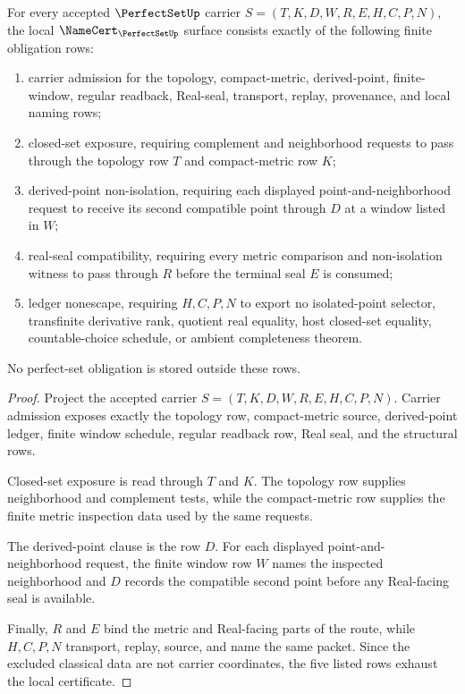 \begin{theorem}
\label{thm:perfect-set-namecert-obligations}
For every accepted $\PerfectSetUp$ carrier $S=(T,K,D,W,R,E,H,C,P,N)$, the local $\NameCert_{\PerfectSetUp}$ surface consists exactly of the following finite obligation rows:
\begin{enumerate}
\item carrier admission for the topology, compact-metric, derived-point, finite-window, regular readback, Real-seal, transport, replay, provenance, and local naming rows;
\item closed-set exposure, requiring complement and neighborhood requests to pass through the topology row $T$ and compact-metric row $K$;
\item derived-point non-isolation, requiring each displayed point-and-neighborhood request to receive its second compatible point through $D$ at a window listed in $W$;
\item real-seal compatibility, requiring every metric comparison and non-isolation witness to pass through $R$ before the terminal seal $E$ is consumed;
\item ledger nonescape, requiring $H,C,P,N$ to export no isolated-point selector, transfinite derivative rank, quotient real equality, host closed-set equality, countable-choice schedule, or ambient completeness theorem.
\end{enumerate}
No perfect-set obligation is stored outside these rows.
\end{theorem}
\begin{proof}
Project the accepted carrier $S=(T,K,D,W,R,E,H,C,P,N)$. Carrier admission exposes exactly the topology row, compact-metric source, derived-point ledger, finite window schedule, regular readback row, Real seal, and the structural rows.

Closed-set exposure is read through $T$ and $K$. The topology row supplies neighborhood and complement tests, while the compact-metric row supplies the finite metric inspection data used by the same requests.

The derived-point clause is the row $D$. For each displayed point-and-neighborhood request, the finite window row $W$ names the inspected neighborhood and $D$ records the compatible second point before any Real-facing seal is available.

Finally, $R$ and $E$ bind the metric and Real-facing parts of the route, while $H,C,P,N$ transport, replay, source, and name the same packet. Since the excluded classical data are not carrier coordinates, the five listed rows exhaust the local certificate.
\end{proof}

